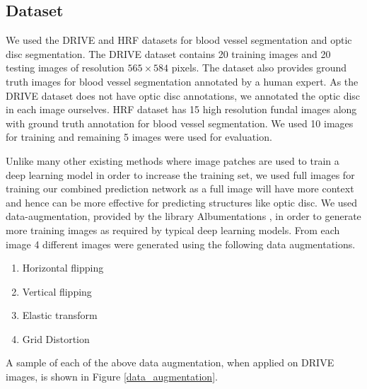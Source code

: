 \subsection{Dataset}
We used the DRIVE \cite{drive} and HRF \cite{budai2013robust}  datasets for blood vessel segmentation and optic disc segmentation.
The DRIVE dataset contains 20 training images and 20 testing images of resolution $565 \times 584$ pixels.
The dataset also provides ground truth images for blood vessel segmentation annotated by a human expert.
As the DRIVE dataset does not have optic disc annotations, we annotated the optic disc in each image ourselves.
HRF dataset has 15 high resolution fundal images along with ground truth annotation for blood vessel segmentation.
We used 10 images for training and  remaining 5 images  were used for evaluation.

Unlike many other existing methods where image patches are used to train a  deep learning model in order to increase the training set, we used full images for training our combined prediction network as a full image will have more context and hence can be more effective for predicting structures like optic disc.
We used data-augmentation, provided by the library Albumentations \cite{buslaev2020albumentations}, in order to generate more training images as required by typical deep learning models.
From each image 4 different images were generated using the following data augmentations.
\begin{enumerate}
  \item Horizontal flipping
  \item Vertical flipping
  \item Elastic transform
  \item Grid Distortion
\end{enumerate}
A sample of each of the above data augmentation, when applied on DRIVE images,  is shown in Figure \ref{data_augmentation}.

